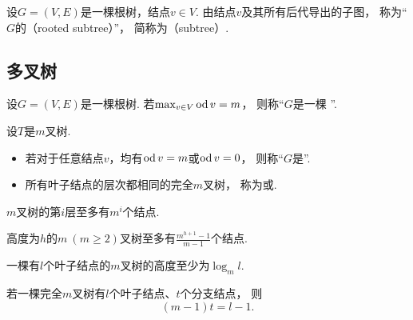 \begin{definition}
设\(G = (V,E)\)是一棵根树，结点\(v \in V\).
由结点\(v\)及其所有后代导出的子图，
称为“\(G\)的（rooted subtree）”，
简称为（subtree）.
\end{definition}

\subsection{多叉树}
\begin{definition}
设\(G = (V,E)\)是一棵根树.
若\(\max_{v \in V} \operatorname{od} v = m\)，
则称“\(G\)是一棵 ”.
\end{definition}

\begin{definition}
设\(T\)是\(m\)叉树.
\begin{itemize}
	\item 若对于任意结点\(v\)，均有\(\operatorname{od} v = m\)或\(\operatorname{od} v = 0\)，
	则称“\(G\)是”.

	\item 所有叶子结点的层次都相同的完全\(m\)叉树，
	称为或.
\end{itemize}
\end{definition}

\begin{property}
\(m\)叉树的第\(i\)层至多有\(m^i\)个结点.
\end{property}

\begin{property}
高度为\(h\)的\(m\ (m\geq2)\)叉树至多有\(\frac{m^{h+1}-1}{m-1}\)个结点.
\end{property}

\begin{property}
一棵有\(l\)个叶子结点的\(m\)叉树的高度至少为\(\log_m l\).
\end{property}

\begin{property}
若一棵完全\(m\)叉树有\(l\)个叶子结点、\(t\)个分支结点，
则\[
	(m-1)t=l-1.
\]
\end{property}

